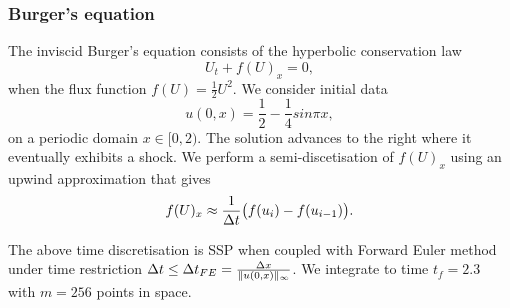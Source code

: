 \subsubsection{Burger's equation}\label{subsubsec:burgers}

The inviscid Burger's equation consists of the hyperbolic conservation law
\begin{equation}\label{eq5.5}
    U_{t} + f(U)_{x} = 0,
\end{equation}
when the flux function $f(U) = \frac{1}{2}U^{2}$. We consider initial data
\begin{equation}\label{eq5.6}
    u(0,x)  = \frac{1}{2} - \frac{1}{4}sin{\pi x},
\end{equation}
on a periodic domain $x \in [0,2)$. The solution advances to the right where it eventually exhibits a shock. We perform a semi-discetisation of $f(U)_{x}$ using an upwind approximation \cite{Ketcheson2009} that gives
\begin{equation}\label{eq5.7}
    f(U)_{x} \approx \frac{1}{\Delta t}\bigl(f(u_{i}) - f(u_{i-1})\bigr).
\end{equation}

The above time discretisation is SSP when coupled with Forward Euler method under time restriction $\Delta t \leq {\Delta t}_{FE} = \frac{\Delta x}{\|u(0,x)\|_{\infty}}$. We integrate to time $t_{f} = 2.3$ with $m = 256$ points in space.
\newline

